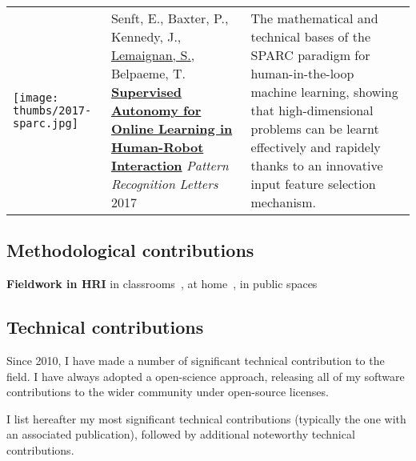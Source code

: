 {\begin{tabular}{p{1.7cm}p{7cm}p{8cm}}
    \vspace{-.20cm}\texttt{[image: thumbs/2017-sparc.jpg]} &

    Senft, E., Baxter, P., Kennedy, J., \ul{Lemaignan, S.}, Belpaeme, T.
    \newline\href{https://doi.org/10.1016/j.patrec.2017.03.015}{\textbf{Supervised
    Autonomy for Online Learning in Human-Robot Interaction}}
    \newline \textit{Pattern Recognition Letters} 2017
    & \small The mathematical and technical bases of the SPARC
    paradigm for human-in-the-loop machine learning, showing that
    high-dimensional problems can be learnt effectively and rapidely thanks to
    an innovative input feature selection mechanism.
    \textbf{}\\
\end{tabular}
}

\subsection{Methodological contributions}

\cite{baxter2016characterising}
\cite{irfan2018social}
\cite{kennedy2016cautious}
\cite{kennedy2017child}

        \textbf{Fieldwork in HRI}
        \small in
        classrooms~\cite{hood2015when, lemaignan2016learning, jacq2016building,
        baxter2015wider,kennedy2016cautious,senft2018robots}, at
        home~\cite{mondada2015ranger}, in public spaces~\cite{winkle2020insitu}

\subsection{Technical contributions}

Since 2010, I have made a number of significant technical contribution to the
field. I have always adopted a open-science approach, releasing all of my
software contributions to the wider community under open-source licenses.

I list hereafter my most significant technical contributions (typically the one
with an associated publication), followed by additional noteworthy technical
contributions.

